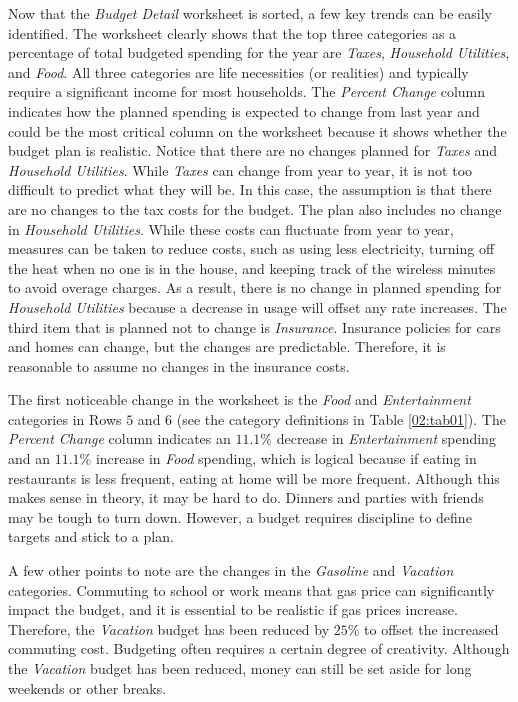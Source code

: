 Now that the \textit{Budget Detail} worksheet is sorted, a few key trends can be easily identified. The worksheet clearly shows that the top three categories as a percentage of total budgeted spending for the year are \textit{Taxes}, \textit{Household Utilities}, and \textit{Food}. All three categories are life necessities (or realities) and typically require a significant income for most households. The \textit{Percent Change} column indicates how the planned spending is expected to change from last year and could be the most critical column on the worksheet because it shows whether the budget plan is realistic. Notice that there are no changes planned for \textit{Taxes} and \textit{Household Utilities}. While \textit{Taxes} can change from year to year, it is not too difficult to predict what they will be. In this case, the assumption is that there are no changes to the tax costs for the budget. The plan also includes no change in \textit{Household Utilities}. While these costs can fluctuate from year to year, measures can be taken to reduce costs, such as using less electricity, turning off the heat when no one is in the house, and keeping track of the wireless minutes to avoid overage charges. As a result, there is no change in planned spending for \textit{Household Utilities} because a decrease in usage will offset any rate increases. The third item that is planned not to change is \textit{Insurance}. Insurance policies for cars and homes can change, but the changes are predictable. Therefore, it is reasonable to assume no changes in the insurance costs.

The first noticeable change in the worksheet is the \textit{Food} and \textit{Entertainment} categories in Rows $ 5 $ and $ 6 $ (see the category definitions in Table \ref{02:tab01}). The \textit{Percent Change} column indicates an $ 11.1\% $ decrease in \textit{Entertainment} spending and an $ 11.1\% $ increase in \textit{Food} spending, which is logical because if eating in restaurants is less frequent, eating at home will be more frequent. Although this makes sense in theory, it may be hard to do. Dinners and parties with friends may be tough to turn down. However, a budget requires discipline to define targets and stick to a plan.

A few other points to note are the changes in the \textit{Gasoline} and \textit{Vacation} categories. Commuting to school or work means that gas price can significantly impact the budget, and it is essential to be realistic if gas prices increase. Therefore, the \textit{Vacation} budget has been reduced by $ 25\% $ to offset the increased commuting cost. Budgeting often requires a certain degree of creativity. Although the \textit{Vacation} budget has been reduced, money can still be set aside for long weekends or other breaks.


